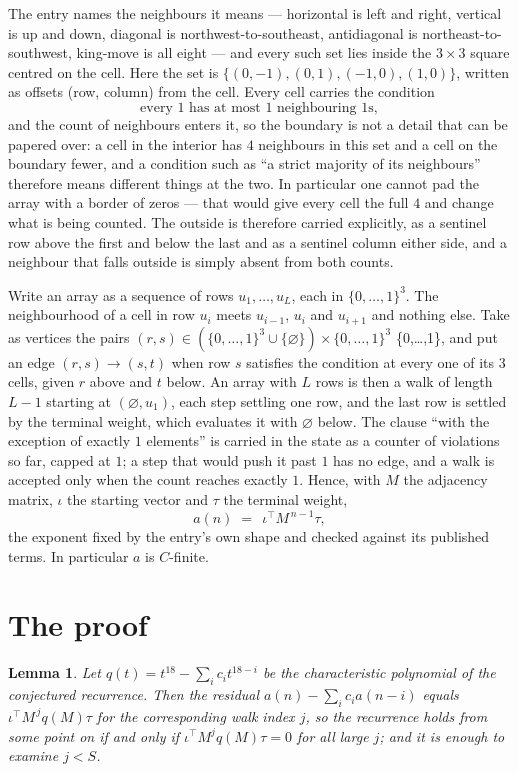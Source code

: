 \documentclass[11pt,a4paper]{article}
\theoremstyle{plain}
\newtheorem{lemma}[theorem]{Lemma}
\theoremstyle{definition}
\begin{document}
The entry names the neighbours it means --- horizontal is left and right, vertical is up and
down, diagonal is northwest-to-southeast, antidiagonal is northeast-to-southwest, king-move is
all eight --- and every such set lies inside the $3\times3$ square centred on the cell. Here
the set is $\{(0,-1), (0,1), (-1,0), (1,0)\}$, written as offsets (row, column) from the cell. Every cell carries
the condition
\[
\text{every 1 has at most 1 neighbouring 1s},
\]
and the count of neighbours enters it, so the boundary is not a detail that can be papered
over: a cell in the interior has $4$ neighbours in this set and a cell on the boundary
fewer, and a condition such as ``a strict majority of its neighbours'' therefore means
different things at the two. In particular one cannot pad the array with a border of zeros ---
that would give every cell the full $4$ and change what is being counted. The outside is
therefore carried
explicitly, as a sentinel row above the first and below the last and as a sentinel column
either side, and a neighbour that falls outside is simply absent from both counts.

Write an array as a sequence of rows $u_1,\dots,u_L$, each in
$\{0,\dots,1\}^{3}$. The neighbourhood of a cell in row $u_i$ meets $u_{i-1}$,
$u_i$ and $u_{i+1}$ and nothing else. Take as vertices the pairs
$(r,s)\in(\{0,\dots,1\}^{3}\cup\{\varnothing\})\times\{0,\dots,1\}^{3}$ \times \{0,\dots,1\},
and put an edge $(r,s)\to(s,t)$ when row $s$ satisfies the condition at every one of its
$3$ cells, given $r$ above and $t$ below. An array with $L$ rows is then a walk of length
$L-1$ starting at $(\varnothing,u_1)$, each step settling one row, and the last row is
settled by the terminal weight, which evaluates it with $\varnothing$ below. The clause ``with the exception of exactly $1$ elements'' is carried in
the state as a counter of violations so far, capped at $1$; a step that would push it past
$1$ has no edge, and a walk is accepted only when the count reaches exactly $1$. Hence,
with $M$ the adjacency matrix, $\iota$ the starting vector and $\tau$ the terminal weight,
\[
a(n)\;=\;\,\iota^{\!\top}M^{\,n-1}\tau ,
\]
the exponent fixed by the entry's own shape and checked against its published terms. In
particular $a$ is $C$-finite.

\section{The proof}

\begin{lemma}\label{lem:crit}
Let $q(t)=t^{18}-\sum_i c_it^{18-i}$ be the characteristic polynomial of the
conjectured recurrence. Then the residual $a(n)-\sum_ic_ia(n-i)$ equals
$\iota^{\!\top}M^{\,j}q(M)\tau$ for the corresponding walk index $j$, so the
recurrence holds from some point on if and only if $\iota^{\!\top}M^{j}q(M)\tau=0$ for all
large $j$; and it is enough to examine $j<S$.
\end{lemma}
\end{document}
